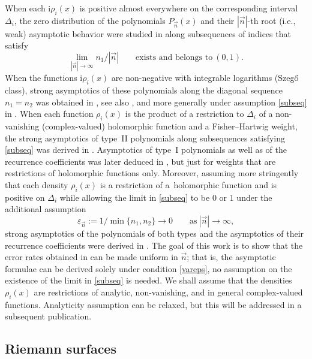 \documentclass[pdftex]{sigma}
\numberwithin{equation}{section}
\newcommand{\n}{{\vec n}}
\newcommand{\ic}{\mathrm{i}}
\begin{document}
When each $ \ic\rho_i(x) $ is positive almost everywhere on the corresponding interval $ \Delta_i $, the zero distribution of the polynomials $ P_\n(x) $ and their $ |\n| $-th root (i.e., weak) asymptotic behavior were studied in \cite{GRakh81} along subsequences of indices that satisfy
\begin{equation}
\label{subseq}
\lim_{|\n|\to\infty}n_1/|\n| \qquad \text{exists and belongs to} \ (0,1).
\end{equation}
When the functions $ \ic\rho_i(x) $ are non-negative with integrable logarithms (Szeg\H{o} class), strong asymptotics of these polynomials along the diagonal sequence $ n_1=n_2 $ was obtained in \cite{Ap88}, see also \cite{Kal79,NutTr87}, and more generally under assumption \eqref{subseq} in \cite{uApDenYa}. When each function $ \rho_i(x) $ is the product of a restriction to $ \Delta_i $ of a non-vanishing (complex-valued) holomorphic function and a Fisher--Hartwig weight, the strong asymptotics of type~II polynomials along subsequences satisfying \eqref{subseq} was derived in \cite{Ya16}. Asymptotics of type~I polynomials as well as of the recurrence coefficients was later deduced in \cite{ApDenYa20}, but just for weights that are restrictions of holomorphic functions only. Moreover, assuming more stringently that each density $ \rho_i(x) $ is a restriction of a~holomorphic function and is positive on $ \Delta_i $ while allowing the limit in \eqref{subseq} to be $ 0 $ or $ 1 $ under the additional assumption
\begin{equation}
\label{vareps}
\varepsilon_\n := 1/\min\{n_1,n_2\} \to 0 \qquad \text{as} \ |\n|\to\infty,
\end{equation}
strong asymptotics of the polynomials of both types and the asymptotics of their recurrence coefficients were derived in \cite{ApDenYa21}. The goal of this work is to show that the error rates obtained in \cite{ApDenYa21} can be made uniform in $ \n $; that is, the asymptotic formulae can be derived solely under condition \eqref{vareps}, no assumption on the existence of the limit in \eqref{subseq} is needed. We shall assume that the densities $ \rho_i(x) $ are restrictions of analytic, non-vanishing, and in general complex-valued functions. Analyticity assumption can be relaxed, but this will be addressed in a subsequent publication.

\subsection{Riemann surfaces}
\end{document}
